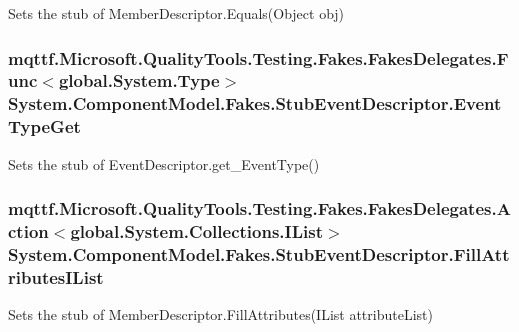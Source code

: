 Sets the stub of Member\-Descriptor.\-Equals(\-Object obj)

\hypertarget{class_system_1_1_component_model_1_1_fakes_1_1_stub_event_descriptor_a2b4f35ed7f5cd94fb61f93766db9c962}{
\subsubsection[{Event\-Type\-Get}]{\setlength{\rightskip}{0pt plus 5cm}mqttf.\-Microsoft.\-Quality\-Tools.\-Testing.\-Fakes.\-Fakes\-Delegates.\-Func$<$global.\-System.\-Type$>$ System.\-Component\-Model.\-Fakes.\-Stub\-Event\-Descriptor.\-Event\-Type\-Get}}\label{class_system_1_1_component_model_1_1_fakes_1_1_stub_event_descriptor_a2b4f35ed7f5cd94fb61f93766db9c962}


Sets the stub of Event\-Descriptor.\-get\-\_\-\-Event\-Type()

\hypertarget{class_system_1_1_component_model_1_1_fakes_1_1_stub_event_descriptor_ac464952155264fc6a046a93ff4ecb6e6}{
\subsubsection[{Fill\-Attributes\-I\-List}]{\setlength{\rightskip}{0pt plus 5cm}mqttf.\-Microsoft.\-Quality\-Tools.\-Testing.\-Fakes.\-Fakes\-Delegates.\-Action$<$global.\-System.\-Collections.\-I\-List$>$ System.\-Component\-Model.\-Fakes.\-Stub\-Event\-Descriptor.\-Fill\-Attributes\-I\-List}}\label{class_system_1_1_component_model_1_1_fakes_1_1_stub_event_descriptor_ac464952155264fc6a046a93ff4ecb6e6}


Sets the stub of Member\-Descriptor.\-Fill\-Attributes(\-I\-List attribute\-List)

